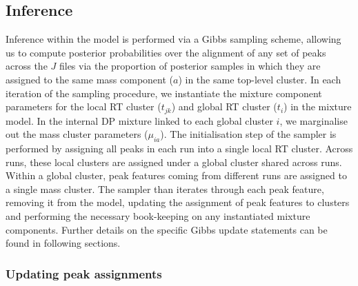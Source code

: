 \subsection{Inference}

Inference within the model is performed via a Gibbs sampling scheme, allowing us to compute posterior probabilities over the alignment of any set of peaks across the $J$ files via the proportion of posterior samples in which they are assigned to the same mass component ($a$) in the same top-level cluster. In each iteration of the sampling procedure, we instantiate the mixture component parameters for the local RT cluster ($t_{jk}$) and global RT cluster ($t_{i}$) in the mixture model. In the internal DP mixture linked to each global cluster $i$, we marginalise out the mass cluster parameters ($\mu_{ia}$). The initialisation step of the sampler is performed by assigning all peaks in each run into a single local RT cluster. Across runs, these local clusters are assigned under a global cluster shared across runs. Within a global cluster, peak features coming from different runs are assigned to a single mass cluster. The sampler than iterates through each peak feature, removing it from the model, updating the assignment of peak features to clusters and performing the necessary book-keeping on any instantiated mixture components. Further details on the specific Gibbs update statements can be found in following sections.

\subsubsection{Updating peak assignments}


